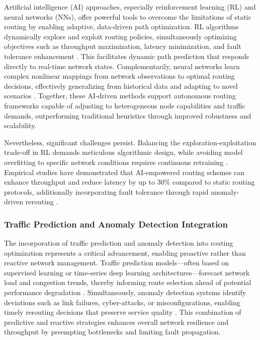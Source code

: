 Artificial intelligence (AI) approaches, especially reinforcement learning (RL) and neural networks (NNs), offer powerful tools to overcome the limitations of static routing by enabling adaptive, data-driven path optimization. RL algorithms dynamically explore and exploit routing policies, simultaneously optimizing objectives such as throughput maximization, latency minimization, and fault tolerance enhancement \cite{ref4}. This facilitates dynamic path prediction that responds directly to real-time network states. Complementarily, neural networks learn complex nonlinear mappings from network observations to optimal routing decisions, effectively generalizing from historical data and adapting to novel scenarios \cite{ref17}\textemdash\cite{ref20}. Together, these AI-driven methods support autonomous routing frameworks capable of adjusting to heterogeneous node capabilities and traffic demands, outperforming traditional heuristics through improved robustness and scalability.

Nevertheless, significant challenges persist. Balancing the exploration-exploitation trade-off in RL demands meticulous algorithmic design, while avoiding model overfitting to specific network conditions requires continuous retraining \cite{ref53}. Empirical studies have demonstrated that AI-empowered routing schemes can enhance throughput and reduce latency by up to 30\% compared to static routing protocols, additionally incorporating fault tolerance through rapid anomaly-driven rerouting \cite{ref4}.

\subsubsection{Traffic Prediction and Anomaly Detection Integration}

The incorporation of traffic prediction and anomaly detection into routing optimization represents a critical advancement, enabling proactive rather than reactive network management. Traffic prediction models—often based on supervised learning or time-series deep learning architectures—forecast network load and congestion trends, thereby informing route selection ahead of potential performance degradation \cite{ref50}. Simultaneously, anomaly detection systems identify deviations such as link failures, cyber-attacks, or misconfigurations, enabling timely rerouting decisions that preserve service quality \cite{ref53}. This combination of predictive and reactive strategies enhances overall network resilience and throughput by preempting bottlenecks and limiting fault propagation.


